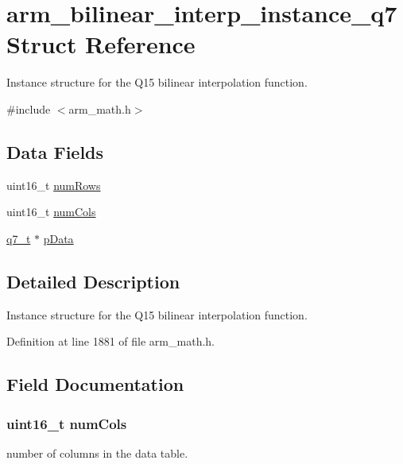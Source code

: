 \hypertarget{structarm__bilinear__interp__instance__q7}{}\section{arm\+\_\+bilinear\+\_\+interp\+\_\+instance\+\_\+q7 Struct Reference}
\label{structarm__bilinear__interp__instance__q7}


Instance structure for the Q15 bilinear interpolation function.  




{\ttfamily \#include $<$arm\+\_\+math.\+h$>$}

\subsection*{Data Fields}
\begin{DoxyCompactItemize}
\item 
uint16\+\_\+t \hyperlink{structarm__bilinear__interp__instance__q7_a1bcf80ccdc2acc29198f1592ae300390}{num\+Rows}
\item 
uint16\+\_\+t \hyperlink{structarm__bilinear__interp__instance__q7_a4bb5ec0d13eb4c9cf887aa8366a44117}{num\+Cols}
\item 
\hyperlink{arm__math_8h_ae541b6f232c305361e9b416fc9eed263}{q7\+\_\+t} $\ast$ \hyperlink{structarm__bilinear__interp__instance__q7_afde7546ea2ec5df9fe42fb04d128a016}{p\+Data}
\end{DoxyCompactItemize}


\subsection{Detailed Description}
Instance structure for the Q15 bilinear interpolation function. 

Definition at line 1881 of file arm\+\_\+math.\+h.



\subsection{Field Documentation}
\subsubsection[{\texorpdfstring{num\+Cols}{numCols}}]{\setlength{\rightskip}{0pt plus 5cm}uint16\+\_\+t num\+Cols}\hypertarget{structarm__bilinear__interp__instance__q7_a4bb5ec0d13eb4c9cf887aa8366a44117}{}\label{structarm__bilinear__interp__instance__q7_a4bb5ec0d13eb4c9cf887aa8366a44117}
number of columns in the data table. 

